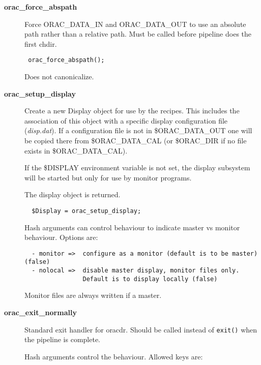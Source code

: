 \begin{description}

\item[{\textbf{orac\_force\_abspath}}] \mbox{}

Force ORAC\_DATA\_IN and ORAC\_DATA\_OUT to use an absolute path
rather than a relative path. Must be called before pipeline
does the first chdir.

\begin{verbatim}
 orac_force_abspath();
\end{verbatim}


Does not canonicalize.


\item[{\textbf{orac\_setup\_display}}] \mbox{}

Create a new Display object for use by the recipes. This includes
the association of this object with a specific display configuration
file (\emph{disp.dat}). If a configuration file is not in \$ORAC\_DATA\_OUT
one will be copied there from \$ORAC\_DATA\_CAL (or \$ORAC\_DIR
if no file exists in \$ORAC\_DATA\_CAL).



If the \$DISPLAY environment variable is not set, the display
subsystem will be started but only for use by monitor programs.



The display object is returned.

\begin{verbatim}
  $Display = orac_setup_display;
\end{verbatim}


Hash arguments can control behaviour to indicate master vs monitor
behaviour. Options are:

\begin{verbatim}
  - monitor =>  configure as a monitor (default is to be master) (false)
  - nolocal =>  disable master display, monitor files only.
                Default is to display locally (false)
\end{verbatim}


Monitor files are always written if a master.


\item[{\textbf{orac\_exit\_normally}}] \mbox{}

Standard exit handler for oracdr. Should be called instead of \texttt{exit()}
when the pipeline is complete.



Hash arguments control the behaviour. Allowed keys are:


\end{description}
